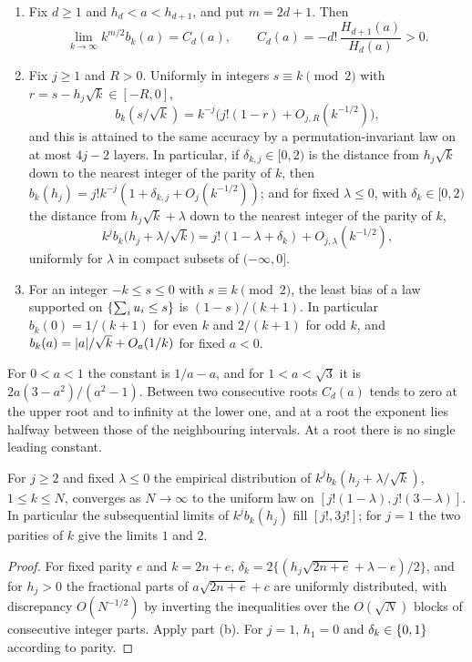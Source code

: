 \begin{lemma}\label{dir:lem:hamming}
\begin{enumerate}[label=\textup{(\alph*)}]
\item Fix $d\ge1$ and $h_d<a<h_{d+1}$, and put $m=2d+1$. Then
\[
 \lim_{k\to\infty}k^{m/2}b_k(a)=C_d(a),\qquad C_d(a)=-d!\,\frac{H_{d+1}(a)}{H_d(a)}>0 .
\]
\item Fix $j\ge1$ and $R>0$. Uniformly in integers $s\equiv k\pmod2$ with
$r=s-h_j\sqrt k\in[-R,0]$,
\[
 b_k(s/\sqrt k)=k^{-j}\bigl(j!(1-r)+O_{j,R}(k^{-1/2})\bigr),
\]
and this is attained to the same accuracy by a permutation-invariant law on at most $4j-2$ layers. In
particular, if $\delta_{k,j}\in[0,2)$ is the distance from $h_j\sqrt k$ down to the nearest integer of the
parity of $k$, then $b_k(h_j)=j!k^{-j}(1+\delta_{k,j}+O_j(k^{-1/2}))$; and for fixed $\lambda\le0$, with
$\delta_k\in[0,2)$ the distance from $h_j\sqrt k+\lambda$ down to the nearest integer of the parity of $k$,
\[
 k^jb_k\bigl(h_j+\lambda/\sqrt k\bigr)=j!(1-\lambda+\delta_k)+O_{j,\lambda}(k^{-1/2}),
\]
uniformly for $\lambda$ in compact subsets of $(-\infty,0]$.
\item For an integer $-k\le s\le0$ with $s\equiv k\pmod2$, the least bias of a law supported on
$\{\sum_iu_i\le s\}$ is $(1-s)/(k+1)$. In particular $b_k(0)=1/(k+1)$ for even $k$ and
$2/(k+1)$ for odd $k$, and $b_k(a)=\lvert a\rvert/\sqrt k+O_a(1/k)$ for fixed $a<0$.
\end{enumerate}
\end{lemma}

For $0<a<1$ the constant is $1/a-a$, and for $1<a<\sqrt3$ it is $2a(3-a^2)/(a^2-1)$. Between two
consecutive roots $C_d(a)$ tends to zero at the upper root and to infinity at the lower one, and
at a root the exponent lies halfway between those of the neighbouring intervals. At a root there is no
single leading constant.

\begin{corollary}\label{dir:cor:hermiteconst}
For $j\ge2$ and fixed $\lambda\le0$ the empirical distribution of $k^jb_k(h_j+\lambda/\sqrt k)$, $1\le k\le N$,
converges as $N\to\infty$ to the uniform law on $[j!(1-\lambda),j!(3-\lambda)]$. In particular the
subsequential limits of $k^jb_k(h_j)$ fill $[j!,3j!]$; for $j=1$ the two parities of $k$ give the limits
$1$ and $2$.
\end{corollary}

\begin{proof}
For fixed parity $e$ and $k=2n+e$, $\delta_k=2\{(h_j\sqrt{2n+e}+\lambda-e)/2\}$, and for $h_j>0$ the
fractional parts of $a\sqrt{2n+e}+c$ are uniformly distributed, with discrepancy $O(N^{-1/2})$ by
inverting the inequalities over the $O(\sqrt N)$ blocks of consecutive integer parts. Apply part (b).
For $j=1$, $h_1=0$ and $\delta_k\in\{0,1\}$ according to parity.
\end{proof}

